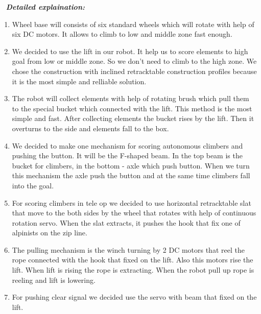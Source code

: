  \newline
\textit{\textbf{Detailed explaination:}}
\begin{enumerate}
	\item Wheel base will consists of six standard wheels which will rotate with help of six DC motors. It allows to climb to low and middle zone fast enough.
	
	\item We decided to use the lift in our robot. It help us to score elements to high goal from low or middle zone. So we don't need to climb to the high zone. We chose the construction with inclined retracktable construction profiles because it is the most simple and relliable solution.
	
	\item The robot will collect elements with help of rotating brush which pull them to the special bucket which connected with the lift. This method is the most simple and fast. After collecting elements the bucket rises by the lift. Then it overturns to the side and elements fall to the box.
	
	\item We decided to make one mechanism for scoring autonomous climbers and pushing the button. It will be the F-shaped beam. In the top beam is the bucket for climbers, in the bottom - axle which push button. When we turn this mechanism the axle push the button and at the same time climbers fall into the goal.
	
	\item For scoring climbers in tele op we decided to use horizontal retracktable slat that move to the both sides by the wheel that rotates with help of continuous rotation servo. When the slat extracts, it pushes the hook that fix one of alpinists on the zip line.
	
	\item The pulling mechanism is the winch turning by 2 DC motors that reel the rope connected with the hook that fixed on the lift. Also this motors rise the lift. When lift is rising the rope is extracting. When the robot pull up rope is reeling and lift is lowering. 
	
	\item For pushing clear signal we decided use the servo with beam that fixed on the lift.

	
\end{enumerate}

 \newline

\fillpage
